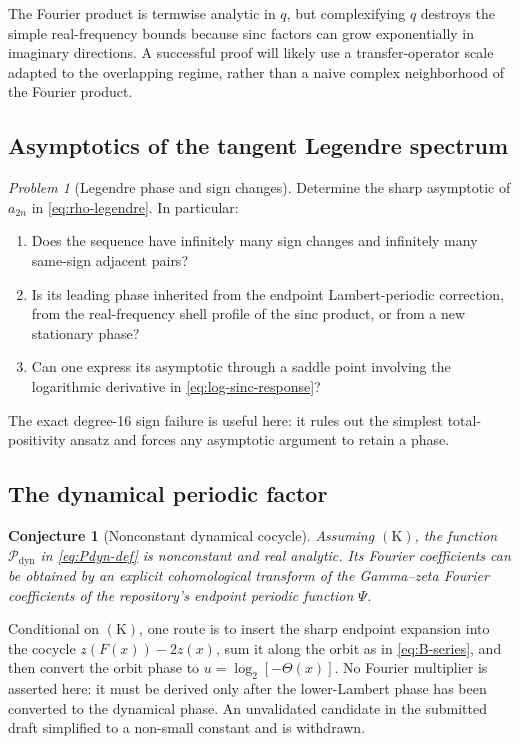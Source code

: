 \documentclass[11pt,oneside]{article}
\newtheorem{conjecture}[theorem]{Conjecture}
\theoremstyle{definition}
\theoremstyle{remark}
\newtheorem{problem}[theorem]{Problem}
\begin{document}
The Fourier product is termwise analytic in \(q\), but complexifying \(q\) destroys the simple
real-frequency bounds because sinc factors can grow exponentially in imaginary directions.
A successful proof will likely use a transfer-operator scale adapted to the overlapping regime,
rather than a naive complex neighborhood of the Fourier product.

\subsection{Asymptotics of the tangent Legendre spectrum}

\begin{problem}[Legendre phase and sign changes]
\label{prob:legendre-asymptotic}
Determine the sharp asymptotic of \(a_{2n}\) in \eqref{eq:rho-legendre}.  In particular:
\begin{enumerate}
\item Does the sequence have infinitely many sign changes and infinitely many same-sign
adjacent pairs?
\item Is its leading phase inherited from the endpoint Lambert-periodic correction, from the
real-frequency shell profile of the sinc product, or from a new stationary phase?
\item Can one express its asymptotic through a saddle point involving the logarithmic derivative
in \eqref{eq:log-sinc-response}?
\end{enumerate}
\end{problem}

The exact degree-16 sign failure is useful here: it rules out the simplest total-positivity
ansatz and forces any asymptotic argument to retain a phase.

\subsection{The dynamical periodic factor}

\begin{conjecture}[Nonconstant dynamical cocycle]
\label{conj:Pdyn}
Assuming \(\mathrm{(K)}\), the function \(\mathcal P_{\mathrm{dyn}}\) in
\eqref{eq:Pdyn-def} is nonconstant and real analytic.  Its Fourier coefficients can be
obtained by an explicit cohomological transform of the Gamma--zeta Fourier coefficients of
the repository's endpoint periodic function \(\Psi\).
\end{conjecture}

Conditional on \(\mathrm{(K)}\), one route is to insert the sharp endpoint expansion into the
cocycle \(z(F(x))-2z(x)\), sum it along the orbit as in \eqref{eq:B-series}, and then convert
the orbit phase to \(u=\log_2[-\Theta(x)]\).  No Fourier multiplier is asserted here: it must
be derived only after the lower-Lambert phase has been converted to the dynamical phase.  An
unvalidated candidate in the submitted draft simplified to a non-small constant and is
withdrawn.
\end{document}

